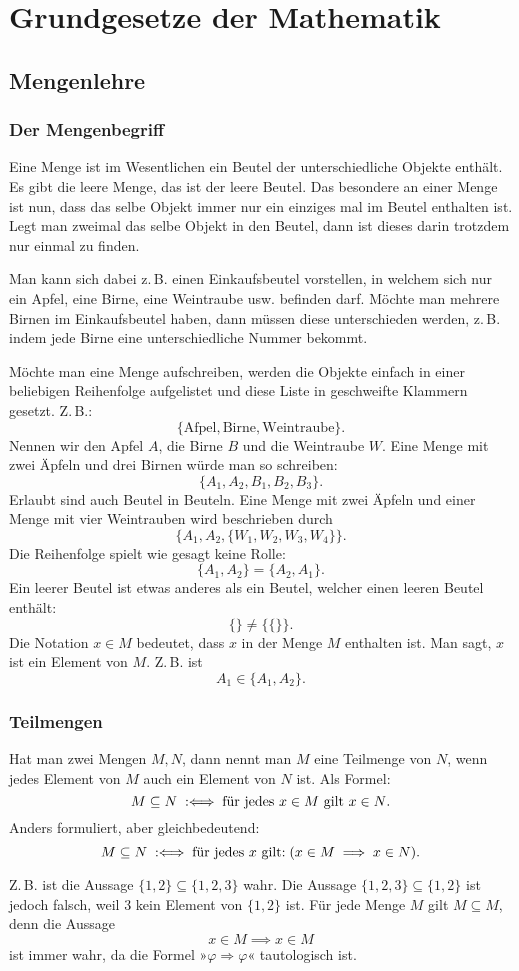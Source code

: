 
\chapter{Grundgesetze der Mathematik}

\section{Mengenlehre}

\subsection{Der Mengenbegriff}

Eine Menge ist im Wesentlichen ein Beutel der unterschiedliche
Objekte enthält. Es gibt die leere Menge, das ist der leere Beutel.
Das besondere an einer Menge ist nun, dass das selbe Objekt immer
nur ein einziges mal im Beutel enthalten ist. Legt man zweimal
das selbe Objekt in den Beutel, dann ist dieses darin trotzdem nur
einmal zu finden.

Man kann sich dabei z.\,B. einen Einkaufsbeutel vorstellen,
in welchem sich nur ein Apfel, eine Birne, eine Weintraube usw.
befinden darf. Möchte man mehrere Birnen im Einkaufsbeutel haben,
dann müssen diese unterschieden werden, z.\,B. indem jede Birne
eine unterschiedliche Nummer bekommt.

Möchte man eine Menge aufschreiben, werden die Objekte einfach
in einer beliebigen Reihenfolge aufgelistet und diese Liste in
geschweifte Klammern gesetzt. Z.\,B.:%
\[\{\mathrm{Afpel}, \mathrm{Birne}, \mathrm{Weintraube}\}.\]
Nennen wir den Apfel $A$, die Birne $B$
und die Weintraube $W$. Eine Menge mit zwei Äpfeln und drei
Birnen würde man so schreiben:%
\[\{A_1, A_2, B_1, B_2, B_3\}.\]
Erlaubt sind auch Beutel in Beuteln. Eine Menge mit zwei Äpfeln
und einer Menge mit vier Weintrauben wird beschrieben durch%
\[\{A_1, A_2, \{W_1,W_2,W_3,W_4\}\}.\]
Die Reihenfolge spielt wie gesagt keine Rolle:%
\[\{A_1,A_2\} = \{A_2,A_1\}.\]
Ein leerer Beutel ist etwas anderes als ein Beutel, welcher einen
leeren Beutel enthält:%
\[\{\} \ne \{\{\}\}.\]
Die Notation $x\in M$ bedeutet, dass $x$ in der Menge $M$ enthalten
ist. Man sagt, $x$ ist ein Element von $M$. Z.\,B. ist
\[A_1\in\{A_1,A_2\}.\]

\newpage
\subsection{Teilmengen}

\begin{Definition}[Teilmengenrelation]
Hat man zwei Mengen $M,N$, dann nennt man $M$ eine Teilmenge von $N$,
wenn jedes Element von $M$ auch ein Element von $N$ ist.
Als Formel:
\[M\subseteq N\;:\Longleftrightarrow\; \text{für jedes $x\in M$ gilt $x\in N$}.\]
Anders formuliert, aber gleichbedeutend:
\[M\subseteq N\;:\Longleftrightarrow\; \text{für jedes $x$ gilt:}\; (x\in M\implies x\in N).\]
\end{Definition}
Z.\,B. ist die Aussage $\{1,2\}\subseteq\{1,2,3\}$ wahr.
Die Aussage $\{1,2,3\}\subseteq\{1,2\}$ ist jedoch falsch,
weil $3$ kein Element von $\{1,2\}$ ist. Für jede Menge $M$ gilt
$M\subseteq M$, denn die Aussage
\[x\in M\implies x\in M\]
ist immer wahr, da die Formel »$\varphi\Rightarrow\varphi$«
tautologisch ist.

